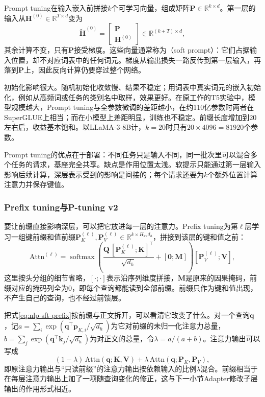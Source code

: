 Prompt tuning在输入嵌入前拼接$k$个可学习向量，组成矩阵$\bm P\in\mathbb R^{k\times d}$。第一层的输入从$\bm H^{(0)}\in\mathbb R^{T\times d}$变为
\[
 \widetilde{\bm H}^{(0)}=\begin{bmatrix}\bm P\\ \bm H^{(0)}\end{bmatrix}\in\mathbb R^{(k+T)\times d},
\]
其余计算不变，只有$\bm P$接受梯度。这些向量通常称为（soft prompt）：它们占据输入位置，却不对应词表中的任何词元。梯度从输出损失一路反传到第一层输入，再落到$\bm P$上，因此反向计算仍要穿过整个网络。

初始化影响很大。随机初始化收敛慢、结果不稳定；用词表中真实词元的嵌入初始化，例如从高频词或任务的类别名中取样，效果更好。在原工作的T5实验中，模型规模越大，Prompt tuning与全参数微调的差距越小，在约110亿参数时两者在SuperGLUE上相当；而在小模型上差距明显，训练也不稳定。前缀长度增加到20左右后，收益基本饱和。以LLaMA-3-8B计，$k=20$时只有$20\times4096=81920$个参数。

Prompt tuning的优点在于部署：不同任务只是输入不同，同一批次里可以混合多个任务的请求，基座完全共享。缺点是作用位置太浅。软提示只能通过第一层输入影响后续计算，深层表示受到的影响是间接的；每个请求还要为$k$个额外位置计算注意力并保存键值。

\subsubsection{Prefix tuning与P-tuning v2}
\label{sec:nlp-sft-prefix-tuning}

要让前缀直接影响深层，可以把它放进每一层的注意力。Prefix tuning为第$\ell$层学习一组键前缀和值前缀$\bm P_K^{(\ell)},\bm P_V^{(\ell)}\in\mathbb R^{k\times H_{\mathrm{kv}}d_h}$，拼接到该层的键和值之前\cite{nlp-sft-li2021prefix}：
\begin{equation}
 \mathrm{Attn}^{(\ell)}=\operatorname{softmax}\!\left(\frac{\bm Q\,[\bm P_K^{(\ell)};\bm K]^{\top}}{\sqrt{d_h}}+[\bm 0;\bm M]\right)[\bm P_V^{(\ell)};\bm V],
 \label{eq:nlp-sft-prefix}
\end{equation}
这里按头分组的细节省略，$[\cdot;\cdot]$表示沿序列维度拼接，$\bm M$是原来的因果掩码，前缀对应的掩码列全为0，即每个查询都能读到全部前缀。前缀只作为键和值出现，不产生自己的查询，也不经过前馈层。

把式\eqref{eq:nlp-sft-prefix}按前缀与正文拆开，可以看清它改变了什么。对一个查询$\bm q$，记$a=\sum_i\exp(\bm q^{\top}\bm p_{K,i}/\sqrt{d_h})$为它对前缀的未归一化注意力总量，$b=\sum_{j}\exp(\bm q^{\top}\bm k_j/\sqrt{d_h})$为对正文的总量，令$\lambda=a/(a+b)$。注意力输出可以写成
\[
 (1-\lambda)\,\mathrm{Attn}(\bm q;\bm K,\bm V)+\lambda\,\mathrm{Attn}(\bm q;\bm P_K,\bm P_V),
\]
即原注意力输出与“只读前缀”的注意力输出按依赖输入的比例$\lambda$混合。前缀相当于在每层注意力输出上加了一项随查询变化的修正，这与下一小节Adapter修改子层输出的作用形式相近。

